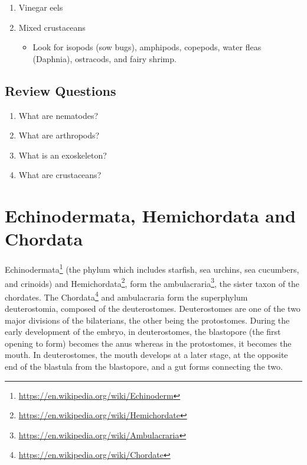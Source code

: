 \documentclass[]{book}
\providecommand{\tightlist}{%
  \setlength{\itemsep}{0pt}\setlength{\parskip}{0pt}}
\let\rmarkdownfootnote\footnote%
\def\footnote{\protect\rmarkdownfootnote}
\renewcommand{\href}[2]{#2\footnote{\url{#1}}}
\begin{document}
\begin{enumerate}
\def\labelenumi{\arabic{enumi}.}
\tightlist
\item
  Vinegar eels
\item
  Mixed crustaceans

  \begin{itemize}
  \tightlist
  \item
    Look for isopods (sow bugs), amphipods, copepods, water fleas (Daphnia), ostracods, and fairy shrimp.
  \end{itemize}
\end{enumerate}

\hypertarget{review-questions-5}{%
\section{Review Questions}\label{review-questions-5}}

\begin{enumerate}
\def\labelenumi{\arabic{enumi}.}
\tightlist
\item
  What are nematodes?
\item
  What are arthropods?
\item
  What is an exoskeleton?
\item
  What are crustaceans?
\end{enumerate}

\hypertarget{echinodermata-hemichordata-and-chordata}{%
\chapter{Echinodermata, Hemichordata and Chordata}\label{echinodermata-hemichordata-and-chordata}}

\href{https://en.wikipedia.org/wiki/Echinoderm}{Echinodermata} (the phylum which includes starfish, sea urchins, sea cucumbers, and crinoids) and \href{https://en.wikipedia.org/wiki/Hemichordate}{Hemichordata}, form the \href{https://en.wikipedia.org/wiki/Ambulacraria}{ambulacraria}, the sister taxon of the chordates. The \href{https://en.wikipedia.org/wiki/Chordate}{Chordata} and ambulacraria form the superphylum deuterostomia, composed of the deuterostomes. Deuterostomes are one of the two major divisions of the bilaterians, the other being the protostomes. During the early development of the embryo, in deuterostomes, the blastopore (the first opening to form) becomes the anus whereas in the protostomes, it becomes the mouth. In deuterostomes, the mouth develops at a later stage, at the opposite end of the blastula from the blastopore, and a gut forms connecting the two.
\end{document}
